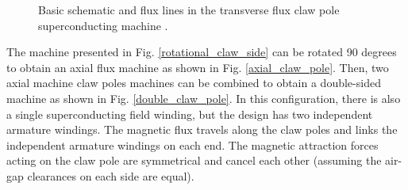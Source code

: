 \documentclass[12pt]{IET02}
\begin{document}
\begin{figure}[]
  \centering

    \caption{Basic schematic and flux lines in the transverse flux claw pole superconducting machine \cite{Keysan2011e}.} 
    \label{rotational_claw_schematic}
\end{figure}

The machine presented in Fig. \ref{rotational_claw_side} can be rotated 90 degrees to obtain an axial flux machine as shown in Fig. \ref{axial_claw_pole}. Then, two axial machine claw poles machines can be combined to obtain a double-sided machine as shown in Fig. \ref{double_claw_pole}. In this configuration, there is also a single superconducting field winding, but the design has two independent armature windings. The magnetic flux travels along the claw poles and links the independent armature windings on each end. The magnetic attraction forces acting on the claw pole are symmetrical and cancel each other (assuming the air-gap clearances on each side are equal). 
\end{document}
